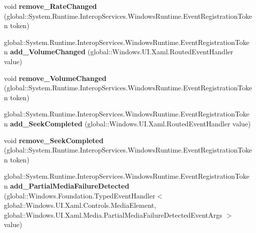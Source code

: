 \begin{DoxyCompactItemize}
void {\bfseries remove\+\_\+\+Rate\+Changed} (global\+::\+System.\+Runtime.\+Interop\+Services.\+Windows\+Runtime.\+Event\+Registration\+Token token)
\item 
\mbox{\label{class_windows_1_1_u_i_1_1_xaml_1_1_controls_1_1_media_element_a5e1f9d35a52763afdd79bdedc9d0de22}} 
global\+::\+System.\+Runtime.\+Interop\+Services.\+Windows\+Runtime.\+Event\+Registration\+Token {\bfseries add\+\_\+\+Volume\+Changed} (global\+::\+Windows.\+U\+I.\+Xaml.\+Routed\+Event\+Handler value)
\item 
\mbox{\label{class_windows_1_1_u_i_1_1_xaml_1_1_controls_1_1_media_element_a58fbddf945f331a65f79f6c4ade4ed8c}} 
void {\bfseries remove\+\_\+\+Volume\+Changed} (global\+::\+System.\+Runtime.\+Interop\+Services.\+Windows\+Runtime.\+Event\+Registration\+Token token)
\item 
\mbox{\label{class_windows_1_1_u_i_1_1_xaml_1_1_controls_1_1_media_element_a49bafb55130b6c1789858252d474a3e9}} 
global\+::\+System.\+Runtime.\+Interop\+Services.\+Windows\+Runtime.\+Event\+Registration\+Token {\bfseries add\+\_\+\+Seek\+Completed} (global\+::\+Windows.\+U\+I.\+Xaml.\+Routed\+Event\+Handler value)
\item 
\mbox{\label{class_windows_1_1_u_i_1_1_xaml_1_1_controls_1_1_media_element_af16697e133d75536db3069f6faf2947b}} 
void {\bfseries remove\+\_\+\+Seek\+Completed} (global\+::\+System.\+Runtime.\+Interop\+Services.\+Windows\+Runtime.\+Event\+Registration\+Token token)
\item 
\mbox{\label{class_windows_1_1_u_i_1_1_xaml_1_1_controls_1_1_media_element_a400ae0b28bde4d8c18c9e3d927836d0a}} 
global\+::\+System.\+Runtime.\+Interop\+Services.\+Windows\+Runtime.\+Event\+Registration\+Token {\bfseries add\+\_\+\+Partial\+Media\+Failure\+Detected} (global\+::\+Windows.\+Foundation.\+Typed\+Event\+Handler$<$ global\+::\+Windows.\+U\+I.\+Xaml.\+Controls.\+Media\+Element, global\+::\+Windows.\+U\+I.\+Xaml.\+Media.\+Partial\+Media\+Failure\+Detected\+Event\+Args $>$ value)
\item 

\end{DoxyCompactItemize}
